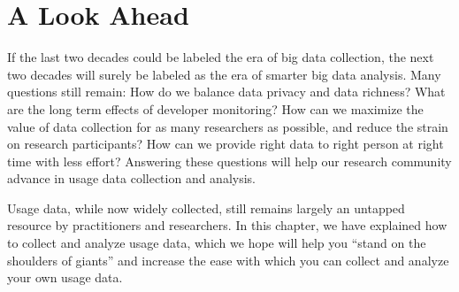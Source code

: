 \section{A Look Ahead}

If the last two decades could be labeled the era
of big data collection,
the next two decades will surely be labeled as the
era of smarter big data analysis.
Many questions still remain:
How do we balance data privacy and data richness?
What are the long term effects of developer monitoring?
How can we maximize the value of data collection
for as many researchers as possible, and reduce the
strain on research participants? How can we provide right data to right person at right time with less effort?
Answering these questions will help our research
community advance in usage data collection and analysis.

Usage data, while now widely collected, still remains largely
an untapped resource by practitioners and researchers.
In this chapter, we have explained how to collect and
analyze usage data, which we hope will help you ``stand
on the shoulders of giants'' and increase the ease
with which you can collect and analyze your own usage data.


